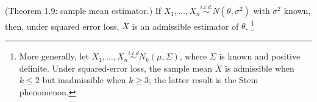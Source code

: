 \begin{mybox}
\begin{enumerate}
    \\(Theorem 1.9: sample mean estimator.) If $X_1, \ldots, X_n \stackrel{i.i.d.}{\sim} N(\theta, \sigma^2)$ with $\sigma^2$ known, then, under squared error loss, $\bar{X}$ is an admissible estimator of $\theta$.
    \footnote{More generally, let $X_1,\ldots,X_n \stackrel{i.i.d}{\sim} N_k(\mu,\Sigma)$, where $\Sigma$ is known and positive definite. Under squared-error loss, the sample mean $\bar{X}$ is admissible when $k\leq 2$ but inadmissible when $k\geq 3$; the latter result is the Stein phenomenon.}
\end{enumerate}
\end{mybox}


